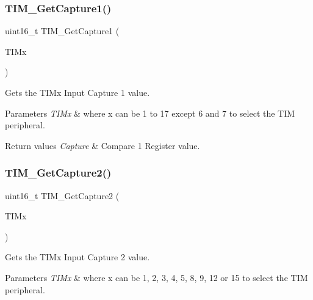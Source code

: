 \subsubsection{\texorpdfstring{TIM\_GetCapture1()}{TIM\_GetCapture1()}}
{\footnotesize\ttfamily uint16\+\_\+t T\+I\+M\+\_\+\+Get\+Capture1 (\begin{DoxyParamCaption}\item[{\mbox{\hyperlink{struct_t_i_m___type_def}{T\+I\+M\+\_\+\+Type\+Def}} $\ast$}]{T\+I\+Mx }\end{DoxyParamCaption})}



Gets the T\+I\+Mx Input Capture 1 value. 


\begin{DoxyParams}{Parameters}
{\em T\+I\+Mx} & where x can be 1 to 17 except 6 and 7 to select the T\+IM peripheral. \\
\hline
\end{DoxyParams}

\begin{DoxyRetVals}{Return values}
{\em Capture} & Compare 1 Register value. \\
\hline
\end{DoxyRetVals}
\mbox{\label{group___t_i_m___private___functions_ga437fcf00ee9d0a9df9150cc120efc5ad}} 
\subsubsection{\texorpdfstring{TIM\_GetCapture2()}{TIM\_GetCapture2()}}
{\footnotesize\ttfamily uint16\+\_\+t T\+I\+M\+\_\+\+Get\+Capture2 (\begin{DoxyParamCaption}\item[{\mbox{\hyperlink{struct_t_i_m___type_def}{T\+I\+M\+\_\+\+Type\+Def}} $\ast$}]{T\+I\+Mx }\end{DoxyParamCaption})}



Gets the T\+I\+Mx Input Capture 2 value. 


\begin{DoxyParams}{Parameters}
{\em T\+I\+Mx} & where x can be 1, 2, 3, 4, 5, 8, 9, 12 or 15 to select the T\+IM peripheral. \\
\hline
\end{DoxyParams}

